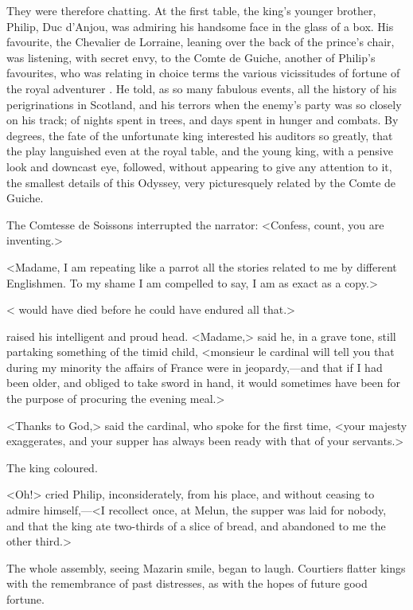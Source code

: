 They were therefore chatting. At the first table, the king's younger brother, Philip, Duc d'Anjou, was admiring his handsome face in the glass of a box. His favourite, the Chevalier de Lorraine, leaning over the back of the prince's chair, was listening, with secret envy, to the Comte de Guiche, another of Philip's favourites, who was relating in choice terms the various vicissitudes of fortune of the royal adventurer . He told, as so many fabulous events, all the history of his perigrinations in Scotland, and his terrors when the enemy's party was so closely on his track; of nights spent in trees, and days spent in hunger and combats. By degrees, the fate of the unfortunate king interested his auditors so greatly, that the play languished even at the royal table, and the young king, with a pensive look and downcast eye, followed, without appearing to give any attention to it, the smallest details of this Odyssey, very picturesquely related by the Comte de Guiche.

The Comtesse de Soissons interrupted the narrator: <Confess, count, you are inventing.>

<Madame, I am repeating like a parrot all the stories related to me by different Englishmen. To my shame I am compelled to say, I am as exact as a copy.>

< would have died before he could have endured all that.>

 raised his intelligent and proud head. <Madame,> said he, in a grave tone, still partaking something of the timid child, <monsieur le cardinal will tell you that during my minority the affairs of France were in jeopardy,—and that if I had been older, and obliged to take sword in hand, it would sometimes have been for the purpose of procuring the evening meal.>

<Thanks to God,> said the cardinal, who spoke for the first time, <your majesty exaggerates, and your supper has always been ready with that of your servants.>

The king coloured.

<Oh!> cried Philip, inconsiderately, from his place, and without ceasing to admire himself,—<I recollect once, at Melun, the supper was laid for nobody, and that the king ate two-thirds of a slice of bread, and abandoned to me the other third.>

The whole assembly, seeing Mazarin smile, began to laugh. Courtiers flatter kings with the remembrance of past distresses, as with the hopes of future good fortune.

